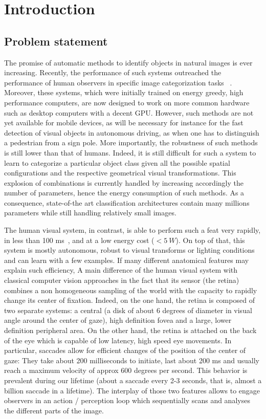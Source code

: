 \section{Introduction}
\label{sec:intro}
\CNS
\subsection{Problem statement}
\fi
The promise of automatic methods to identify objects in natural images is ever increasing. Recently, the performance of such systems outreached the performance of human observers in specific image categorization tasks ~\citep{He15}. Moreover, these systems, which were initially trained on energy greedy, high performance computers, are now designed to work on more common hardware such as desktop computers with a decent GPU. \CNS
However, such methods are not yet available for mobile devices, as will be necessary for instance for the fast detection of visual objects in autonomous driving, as when one has to distinguish a pedestrian from a sign pole. More importantly, the robustness of such methods is still lower than that of humans. Indeed, it is still difficult for such a system to learn to categorize a particular object class given all the possible spatial configurations and the respective geometrical visual transformations. This explosion of combinations is currently handled by increasing accordingly the number of parameters, hence the energy consumption of such methods. As a consequence, state-of-the art classification architectures contain many millions parameters while still handling relatively small images.

The human visual system, in contrast, is able to perform such a feat very rapidly, in less than 100 ms~\citep{Kirchner06}, and at a low energy cost ($<5~W$). On top of that, this system is mostly autonomous, robust to visual transforms or lighting conditions and can learn with a few examples. If many different anatomical features may explain such efficiency, \fi A main difference of the human visual system with classical computer vision approaches in the fact that its sensor (the retina) combines a non homogeneous sampling of the world with the capacity to rapidly change its center of fixation. Indeed, on the one hand, the retina is composed of two separate systems: a central (a disk of about 6 degrees of diameter in visual angle around the center of gaze), high definition fovea and a large, lower definition peripheral area. On the other hand, the retina is attached on the back of the eye which is capable of low latency, high speed eye movements. In particular, saccades allow for efficient changes of the position of the center of gaze: They take about 200 milliseconds to initiate, last about 200 ms and usually reach a maximum velocity of approx 600 degrees per second. This behavior is prevalent during our lifetime (about a saccade every 2-3 seconds, that is, almost a billion saccade in a lifetime). The interplay of those two features allows to engage observers in an action / perception loop which sequentially scans and analyses the different parts of the image. 

